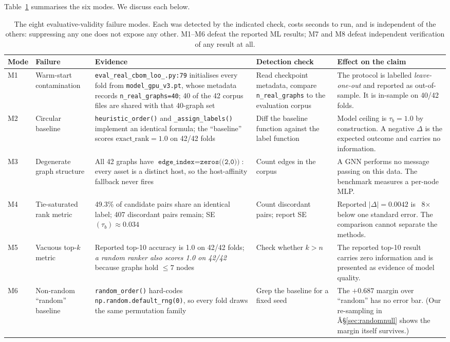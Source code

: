 \documentclass[conference]{IEEEtran}
\newcommand{\code}[1]{\texttt{\small #1}}
\begin{document}
\label{sec:taxonomy}

Table~\ref{tab:modes} summarises the six modes. We discuss each below.

\begin{table}[t]
\centering
\caption{The eight evaluative-validity failure modes. Each was detected by the indicated
check, costs seconds to run, and is independent of the others: suppressing any one does
not expose any other. M1--M6 defeat the reported ML results; M7 and M8 defeat independent
verification of any result at all.}
\label{tab:modes}
\begin{tabular}{@{}p{0.9cm}p{3.0cm}p{3.4cm}p{3.6cm}p{3.6cm}@{}}
\toprule
\textbf{Mode} & \textbf{Failure} & \textbf{Evidence} & \textbf{Detection check} & \textbf{Effect on the claim} \\
\midrule
M1 & Warm-start contamination &
\code{eval\_real\_cbom\_loo}\allowbreak\code{\_.py:79} initialises every fold from \code{model\_gpu\_v3.pt}, whose metadata records \code{n\_real\_graphs=40}; 40 of the 42 corpus files are shared with that 40-graph set &
Read checkpoint metadata, compare \code{n\_real\_graphs} to the evaluation corpus &
The protocol is labelled \emph{leave-one-out} and reported as out-of-sample. It is in-sample on 40/42 folds. \\
\addlinespace
M2 & Circular baseline &
\code{heuristic\_order()} and \code{\_assign\_labels()} implement an identical formula; the ``baseline'' scores $\mathrm{exact\_rank}=1.0$ on 42/42 folds &
Diff the baseline function against the label function &
Model ceiling is $\tau_b=1.0$ by construction. A negative $\Delta$ is the expected outcome and carries no information. \\
\addlinespace
M3 & Degenerate graph structure &
All 42 graphs have $\texttt{edge\_index}=\texttt{zeros((2,0))}$: every asset is a distinct host, so the host-affinity fallback never fires &
Count edges in the corpus &
A GNN performs no message passing on this data. The benchmark measures a per-node MLP. \\
\addlinespace
M4 & Tie-saturated rank metric &
49.3\% of candidate pairs share an identical label; 407 discordant pairs remain; SE$(\tau_b)\approx 0.034$ &
Count discordant pairs; report SE &
Reported $|\Delta|=0.0042$ is ~8$\times$ below one standard error. The comparison cannot separate the methods. \\
\addlinespace
M5 & Vacuous top-\(k\) metric &
Reported top-10 accuracy is 1.0 on 42/42 folds; \emph{a random ranker also scores 1.0 on 42/42} because graphs hold $\le 7$ nodes &
Check whether $k>n$ &
The reported top-10 result carries zero information and is presented as evidence of model quality. \\
\addlinespace
M6 & Non-random ``random'' baseline &
\code{random\_order()} hard-codes \code{np.random}\allowbreak\code{.default\_rng(0)}, so every fold draws the same permutation family &
Grep the baseline for a fixed seed &
The $+0.687$ margin over ``random'' has no error bar. (Our re-sampling in Â§\ref{sec:randomnull} shows the margin itself survives.) \\


\end{tabular}
\end{table}
\end{document}
